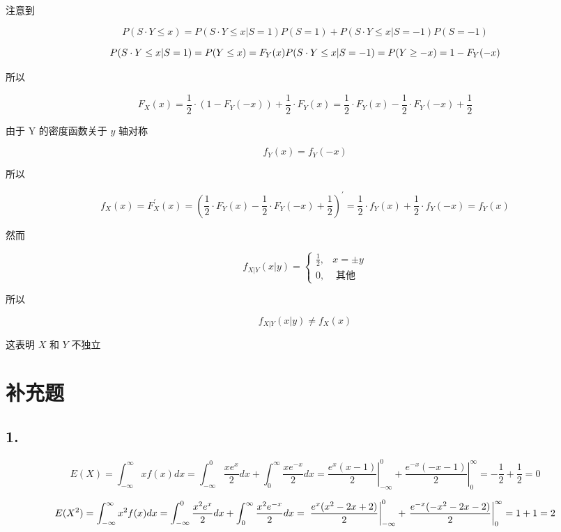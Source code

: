 \documentclass[]{article}
\begin{document}
注意到

\[P(S \cdot Y \leq x)=P(S \cdot Y \leq x|S=1)P(S=1)+P(S \cdot Y \leq x|S=-1)P(S=-1)\]

\[P(S \cdot Y \leq x|S=1)=P(Y\le x)=F_Y(x)\\
P(S \cdot Y \leq x|S=-1)=P(Y\ge -x)=1-F_Y(-x)\]

所以

\[F_{X}(x)=\frac{1}{2} \cdot\left(1-F_{Y}(-x)\right)+\frac{1}{2} \cdot F_{Y}(x)=\frac{1}{2} \cdot F_{Y}(x)-\frac{1}{2} \cdot F_{Y}(-x)+\frac{1}{2}\]

由于 Y 的密度函数关于 \(y\) 轴对称

\[f_{Y}(x)=f_{Y}(-x)\]

所以

\[f_{X}(x)=F_{X}^{\prime}(x)=\left(\frac{1}{2} \cdot F_{Y}(x)-\frac{1}{2} \cdot F_{Y}(-x)+\frac{1}{2}\right)^{\prime}=\frac{1}{2} \cdot f_{Y}(x)+\frac{1}{2} \cdot f_{Y}(-x)=f_Y(x)\]

然而

\[f_{X | Y}(x | y)=\left\{\begin{array}{ll}{\frac{1}{2},} & {x=\pm y} \\ {0,} & {\text { 其他 }}\end{array}\right.\]

所以

\[f_{X | Y}(x | y) \neq f_{X}(x)\]

这表明 \(X\) 和 \(Y\) 不独立

\section{补充题}\label{header-n34}

\subsection{1.}\label{header-n42}

\[E(X)=\int_{-\infty}^{\infty}xf(x) dx=\int_{-\infty}^{0}\frac{xe^{x}}{2} dx+\int_{0}^{\infty}\frac{xe^{-x}}{2} dx=\left.\frac{e^{x} (x-1)}{2}\right|_{-\infty}^{0}+\left.\frac{e^{-x} (-x-1)}{2}\right|_{0} ^{\infty}=-\frac{1}{2}+\frac{1}{2}=0\]

\[E(X^2)=\int_{-\infty}^{\infty}x^2f(x) dx=\int_{-\infty}^{0}\frac{x^2e^{x}}{2} dx+\int_{0}^{\infty}\frac{x^2e^{-x}}{2} dx=\\

\left.\frac{e^{x} (x^2-2 x+2)}{2}\right|_{-\infty}^{0}+\left.\frac{e^{-x} (-x^2-2 x-2)}{2}\right|_{0} ^{\infty}=1+1=2\]
\end{document}
